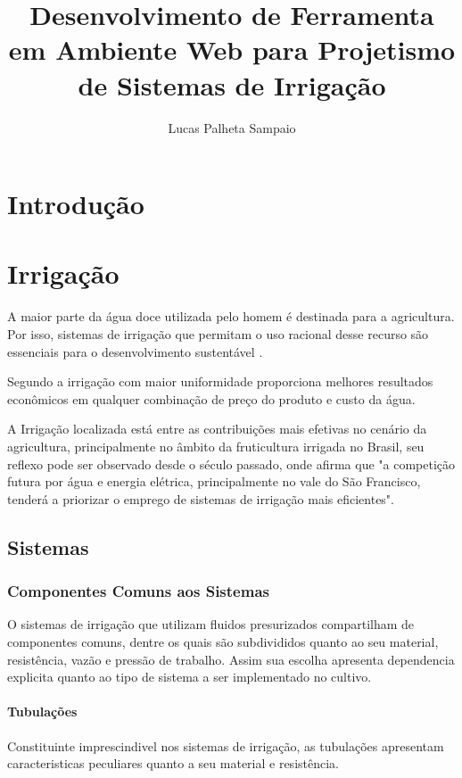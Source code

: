 \documentclass[12pt,a4paper]{book}
\author{Lucas Palheta Sampaio}
\title{Desenvolvimento de Ferramenta em Ambiente Web para Projetismo de Sistemas de Irrigação}
\begin{document}
\maketitle 
\tableofcontents

\chapter{Introdução}



\chapter{Irrigação}

A maior parte da água doce utilizada pelo homem é destinada para a agricultura. Por isso, sistemas de irrigação que permitam o uso racional desse recurso são essenciais para o desenvolvimento sustentável \cite{catalogotigre}.

	Segundo \cite{paz2002otimizaccao} a irrigação com maior uniformidade proporciona melhores resultados econômicos em qualquer combinação de preço do produto e custo da água.

A Irrigação localizada está entre as contribuições mais efetivas no cenário da agricultura, principalmente no âmbito da fruticultura irrigada no Brasil, seu reflexo pode ser observado desde o século passado, onde \cite{nascimento1999caracterizaccao} afirma que "a competição futura por água e energia elétrica, principalmente no vale do São Francisco, tenderá a priorizar o
emprego de sistemas de irrigação mais eficientes".



\section{Sistemas}
\subsection{Componentes Comuns aos Sistemas}
O sistemas de irrigação que utilizam fluidos presurizados compartilham de componentes comuns, dentre os quais são subdivididos quanto ao seu material, resistência, vazão e pressão de trabalho. Assim sua escolha apresenta dependencia explicita quanto ao tipo de sistema a ser implementado no cultivo.



\subsubsection{Tubulações}
Constituinte imprescindivel nos sistemas de irrigação, as tubulações apresentam caracteristicas peculiares quanto a seu material e resistência.
\end{document}
